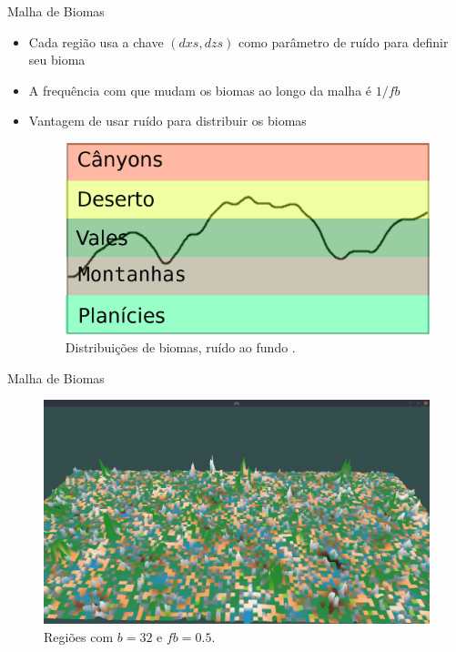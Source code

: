 \begin{frame}{Malha de Biomas}
    \begin{itemize} \setlength\itemsep{1em}
        \item Cada região usa a chave $(dxs, dzs)$ como parâmetro de ruído para definir seu bioma
        \item A frequência com que mudam os biomas ao longo da malha é $1/fb$
        \item Vantagem de usar ruído para distribuir os biomas
        \begin{figure}[H]
            \centering
            \includegraphics[width=.6\textwidth]{img/re2bfb/distnoise.png}
            \caption{Distribuições de biomas, ruído ao fundo \cite{shiffman2012nature}.}
            \label{fig:img_re2bfb_distnoise}
        \end{figure}
    \end{itemize}
\end{frame}

\begin{frame}{Malha de Biomas}
    \begin{figure}[H]
        \centering
        \includegraphics[width=.9\textwidth]{img/re2bfb/fb/05b32.png}
        \caption{Regiões com $b = 32$ e $fb = 0.5$.}
        \label{fig:img_re2bfb_fb_05b32}
    \end{figure}
    
    
\end{frame}

